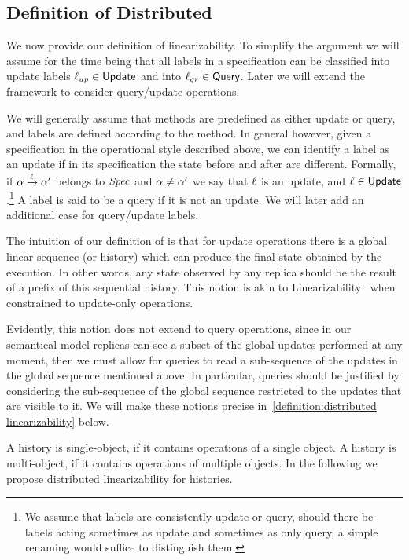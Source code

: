 \subsection{Definition of Distributed \CRDTLin{}}
\label{subsec:definition of distributed linearizability}

We now provide our definition of linearizability.
To simplify the argument we will assume for the time being that all
labels in a specification can be classified into update labels
$\ell_{up} \in \mathsf{Update}$ and into $\ell_{qr} \in \mathsf{Query}$.
Later we will extend the framework to consider query/update
operations.

We will generally assume that methods are predefined as either update
or query, and labels are defined according to the method.
In general however, given a specification in the operational style
described above, we can identify a label as an update if in its
specification the state before and after are different.
Formally, if $\alpha \xrightarrow{\ell} \alpha'$ belongs to $\mathit{Spec}$
and $\alpha \neq \alpha'$ we say that $\ell$ is an update, and
$\ell \in \mathsf{Update}$.\footnote{We assume that labels are
  consistently update or query, should there be labels acting sometimes
  as update and sometimes as only query, a simple renaming would suffice
  to distinguish them.}
A label is said to be a query if it is not an update.
We will later add an additional case for query/update labels.

The intuition of our definition of \crdtlin{} is that for update
operations there is a global linear sequence (or history) which can
produce the final state obtained by the execution.
In other words, any state observed by any replica should be the result
of a prefix of this sequential history.
This notion is akin to Linearizability~\cite{HerlihyW90} when
constrained to update-only operations.

Evidently, this notion does not extend to query operations, since in
our semantical model replicas can see a subset of the global updates
performed at any moment, then we must allow for queries to read a
sub-sequence of the updates in the global sequence mentioned above.
In particular, queries should be justified by considering the
sub-sequence of the global sequence restricted to the updates that are
visible to it.
We will make these notions precise in~\autoref{definition:distributed
  linearizability} below.


 {A history is
  single-object, if it contains operations of a single object.
  A history is multi-object, if it contains operations of multiple
  objects.}
In the following we propose distributed linearizability for histories.

